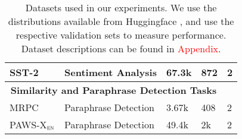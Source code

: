 \begin{table*}[t]
\begin{tabular}{lllll}
  \midrule
  SST-2 \citep{socher2013recursive} & Sentiment Analysis & 67.3k & 872 & 2 \\
  \midrule
  \multicolumn{4}{c}{\textbf{Similarity and Paraphrase Detection Tasks}} \\
  \midrule
  MRPC \citep{dolan2004unsupervised} & Paraphrase Detection & 3.67k & 408 & 2 \\
  PAWS-X$_{\textsc{en}}$ \citep{yang-etal-2019-paws} & Paraphrase Detection & 49.4k & 2k & 2 \\
  \bottomrule
\end{tabular}
\caption{\label{table:datasets} Datasets used in our experiments. We use the distributions available from Huggingface \citep{lhoest-etal-2021-datasets}, and use the respective validation sets to measure performance. Dataset descriptions can be found in \textcolor{red}{Appendix}.}
\end{table*}
\fi